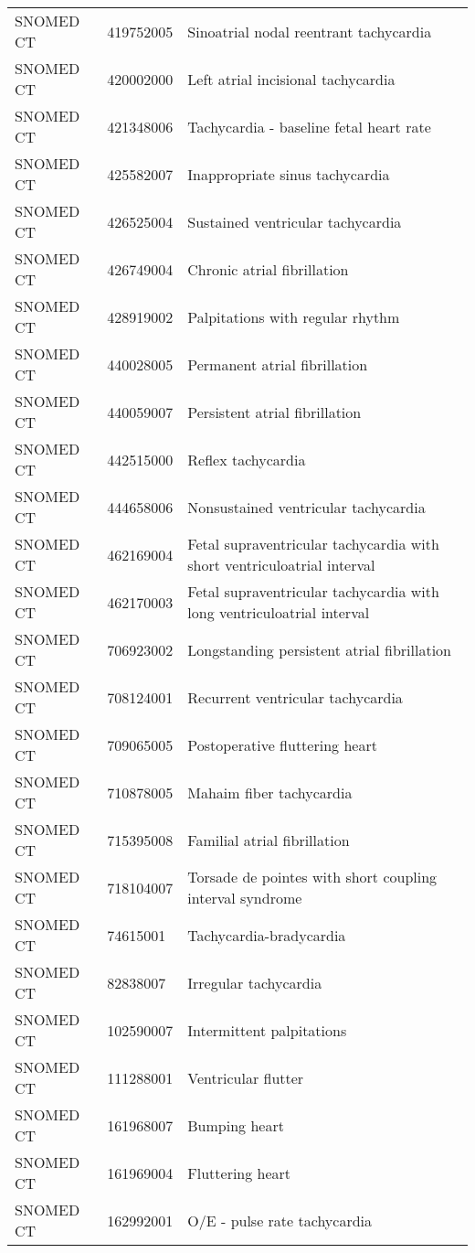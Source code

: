 \begin{longtable}{p{}p{}p{}}
  SNOMED CT & 419752005 & Sinoatrial nodal reentrant tachycardia \\ 
  SNOMED CT & 420002000 & Left atrial incisional tachycardia \\ 
  SNOMED CT & 421348006 & Tachycardia - baseline fetal heart rate \\ 
  SNOMED CT & 425582007 & Inappropriate sinus tachycardia \\ 
  SNOMED CT & 426525004 & Sustained ventricular tachycardia \\ 
  SNOMED CT & 426749004 & Chronic atrial fibrillation \\ 
  SNOMED CT & 428919002 & Palpitations with regular rhythm \\ 
  SNOMED CT & 440028005 & Permanent atrial fibrillation \\ 
  SNOMED CT & 440059007 & Persistent atrial fibrillation \\ 
  SNOMED CT & 442515000 & Reflex tachycardia \\ 
  SNOMED CT & 444658006 & Nonsustained ventricular tachycardia \\ 
  SNOMED CT & 462169004 & Fetal supraventricular tachycardia with short ventriculoatrial interval \\ 
  SNOMED CT & 462170003 & Fetal supraventricular tachycardia with long ventriculoatrial interval \\ 
  SNOMED CT & 706923002 & Longstanding persistent atrial fibrillation \\ 
  SNOMED CT & 708124001 & Recurrent ventricular tachycardia \\ 
  SNOMED CT & 709065005 & Postoperative fluttering heart \\ 
  SNOMED CT & 710878005 & Mahaim fiber tachycardia \\ 
  SNOMED CT & 715395008 & Familial atrial fibrillation \\ 
  SNOMED CT & 718104007 & Torsade de pointes with short coupling interval syndrome \\ 
  SNOMED CT & 74615001 & Tachycardia-bradycardia \\ 
  SNOMED CT & 82838007 & Irregular tachycardia \\ 
  SNOMED CT & 102590007 & Intermittent palpitations \\ 
  SNOMED CT & 111288001 & Ventricular flutter \\ 
  SNOMED CT & 161968007 & Bumping heart \\ 
  SNOMED CT & 161969004 & Fluttering heart \\ 
  SNOMED CT & 162992001 & O/E - pulse rate tachycardia \\ 

\end{longtable}

